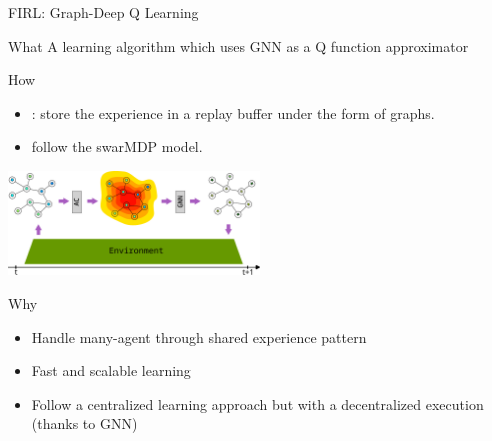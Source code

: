 \documentclass[presentation, 8pt,169]{beamer}\mode<presentation>{\usetheme{AMSBolognaFC}}
\begin{document}
\begin{frame}{FIRL: Graph-Deep Q Learning}
  \begin{block}{What}
    A learning algorithm which uses GNN as a Q function approximator
  \end{block}
  \begin{block}{How}
    \begin{itemize}
      \item {}: store the experience in a replay buffer under the form of graphs.
      \item {} follow the swarMDP model.
    \end{itemize}
    \centering
    \includegraphics[width=0.5\textwidth]{img/architecture.pdf}
  
  \end{block}
  \begin{alertblock}{Why}
    \begin{itemize}
      \item Handle many-agent through shared experience pattern 
      \item Fast and scalable learning 
      \item Follow a centralized learning approach but with a decentralized execution (thanks to GNN)
    \end{itemize}
  \end{alertblock}
\end{frame}
\end{document}
